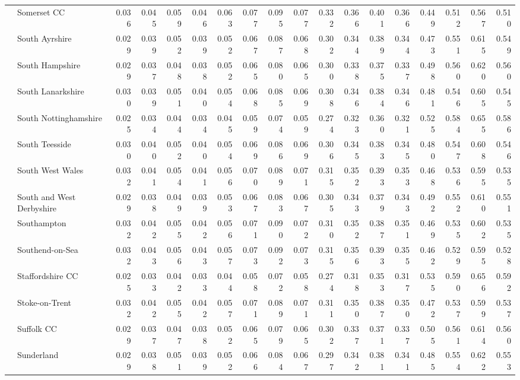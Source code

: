 \begin{tabular}{llrrrrrrrrrrrrrrrr}
 & Somerset CC & 0.036 & 0.045 & 0.059 & 0.046 & 0.063 & 0.077 & 0.095 & 0.077 & 0.332 & 0.366 & 0.401 & 0.366 & 0.449 & 0.512 & 0.567 & 0.510 \\
 & South Ayrshire & 0.029 & 0.039 & 0.052 & 0.039 & 0.052 & 0.067 & 0.087 & 0.068 & 0.302 & 0.344 & 0.389 & 0.344 & 0.473 & 0.551 & 0.615 & 0.549 \\
 & South Hampshire & 0.029 & 0.037 & 0.048 & 0.038 & 0.052 & 0.065 & 0.080 & 0.065 & 0.300 & 0.338 & 0.375 & 0.337 & 0.498 & 0.560 & 0.620 & 0.560 \\
 & South Lanarkshire & 0.030 & 0.039 & 0.051 & 0.040 & 0.054 & 0.068 & 0.085 & 0.069 & 0.308 & 0.346 & 0.384 & 0.346 & 0.481 & 0.546 & 0.605 & 0.545 \\
 & South Nottinghamshire & 0.025 & 0.034 & 0.044 & 0.034 & 0.045 & 0.059 & 0.074 & 0.059 & 0.274 & 0.323 & 0.360 & 0.321 & 0.525 & 0.584 & 0.655 & 0.586 \\
 & South Teesside & 0.030 & 0.040 & 0.052 & 0.040 & 0.054 & 0.069 & 0.086 & 0.069 & 0.306 & 0.345 & 0.383 & 0.345 & 0.480 & 0.547 & 0.608 & 0.546 \\
 & South West Wales & 0.032 & 0.041 & 0.054 & 0.041 & 0.056 & 0.070 & 0.089 & 0.071 & 0.315 & 0.352 & 0.393 & 0.353 & 0.468 & 0.536 & 0.595 & 0.535 \\
 & South and West Derbyshire & 0.029 & 0.038 & 0.049 & 0.039 & 0.053 & 0.067 & 0.083 & 0.067 & 0.305 & 0.343 & 0.379 & 0.343 & 0.492 & 0.552 & 0.610 & 0.551 \\
 & Southampton & 0.032 & 0.042 & 0.055 & 0.042 & 0.056 & 0.071 & 0.090 & 0.072 & 0.310 & 0.352 & 0.387 & 0.351 & 0.469 & 0.535 & 0.602 & 0.535 \\
 & Southend-on-Sea & 0.032 & 0.043 & 0.056 & 0.043 & 0.057 & 0.073 & 0.092 & 0.073 & 0.315 & 0.356 & 0.393 & 0.355 & 0.462 & 0.529 & 0.595 & 0.528 \\
 & Staffordshire CC & 0.025 & 0.033 & 0.042 & 0.033 & 0.044 & 0.058 & 0.072 & 0.058 & 0.274 & 0.318 & 0.353 & 0.317 & 0.535 & 0.590 & 0.656 & 0.592 \\
 & Stoke-on-Trent & 0.032 & 0.042 & 0.055 & 0.042 & 0.057 & 0.071 & 0.089 & 0.071 & 0.311 & 0.350 & 0.387 & 0.350 & 0.472 & 0.537 & 0.599 & 0.537 \\
 & Suffolk CC & 0.029 & 0.037 & 0.047 & 0.038 & 0.052 & 0.065 & 0.079 & 0.065 & 0.302 & 0.337 & 0.371 & 0.337 & 0.505 & 0.561 & 0.614 & 0.560 \\
 & Sunderland & 0.029 & 0.038 & 0.051 & 0.039 & 0.052 & 0.066 & 0.084 & 0.067 & 0.297 & 0.342 & 0.381 & 0.341 & 0.485 & 0.554 & 0.622 & 0.553 \\

\end{tabular}
